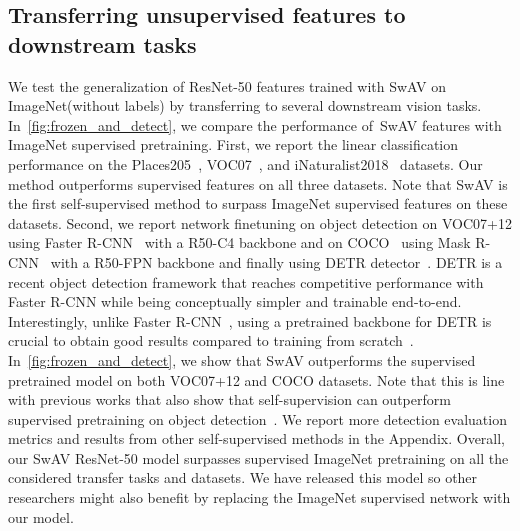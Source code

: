 \documentclass{article}
\def\OURS{SwAV\xspace}
\newcommand{\appendixName}{Appendix}
\newcommand{\ImNet}{ImageNet\xspace}
\newcommand{\VOCseven}{VOC07\xspace}
\newcommand{\VOCseventwelve}{VOC07+12\xspace}
\newcommand{\Places}{Places205\xspace}
\begin{document}
\subsection{Transferring unsupervised features to downstream tasks}
\label{sec:downstream}
We test the generalization of ResNet-50 features trained with \OURS on \ImNet (without labels) by transferring to several downstream vision tasks.
In~\cref{fig:frozen_and_detect}, we compare the performance of~\OURS features with ImageNet supervised pretraining.
First, we report the linear classification performance on the \Places~\cite{zhou2014learning}, \VOCseven~\cite{everingham2010pascal}, and iNaturalist2018~\cite{van2018inaturalist} datasets.
Our method outperforms supervised features on all three datasets.
Note that \OURS is the first self-supervised method to surpass ImageNet supervised features on these datasets.
Second, we report network finetuning on object detection on \VOCseventwelve using Faster R-CNN~\cite{ren2015faster} with a R50-C4 backbone and on COCO~\cite{lin2014microsoft} using Mask R-CNN~\cite{he2017mask} with a R50-FPN backbone and finally using DETR detector~\cite{carion2020end}.
DETR is a recent object detection framework that reaches competitive performance with Faster R-CNN while being conceptually simpler and trainable end-to-end.
Interestingly, unlike Faster R-CNN~\cite{ren2015faster}, using a pretrained backbone for DETR is crucial to obtain good results compared to training from scratch~\cite{carion2020end}.
In~\cref{fig:frozen_and_detect}, we show that \OURS outperforms the supervised pretrained model on both \VOCseventwelve and COCO datasets.
Note that this is line with previous works that also show that self-supervision can outperform supervised pretraining on object detection~\cite{misra2019self,he2019momentum,gidaris2020learning}.
We report more detection evaluation metrics and results from other self-supervised methods in the \appendixName.
Overall, our \OURS ResNet-50 model surpasses supervised ImageNet pretraining on all the considered transfer tasks and datasets.
We have released this model so other researchers might also benefit by replacing the ImageNet supervised network with our model.
\end{document}

